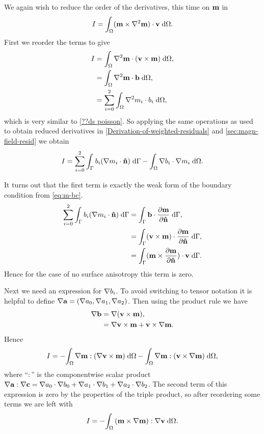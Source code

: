 We again wish to reduce the order of the derivatives, this time on $\mathbf{m}$ in
\begin{equation}
  I = \int_\Omega (\mathbf{m} \times \nabla^2 \mathbf{m}) \cdot \mathbf{v} {\; \text{d}}\Omega.
  \label{eq:46}
\end{equation}
First we reorder the terms to give
\begin{equation}
  \begin{aligned}
    I &= {\int_{\Omega} \nabla^2 \mathbf{m} \cdot (\mathbf{v} \times \mathbf{m}) {\; \text{d}} {\Omega}}, \\
      &= {\int_{\Omega} \nabla^2 \mathbf{m} \cdot {\mathbf{b}} {\; \text{d}} {\Omega}}, \\
      &= \sum_{i=0}^2 {\int_{\Omega} \nabla^2 m_i \cdot b_i {\; \text{d}} {\Omega}},
  \end{aligned}
\end{equation}
which is very similar to \eqref{??ds poisson}. So applying the same operations as used to obtain reduced derivatives in \autoref{Derivation-of-weighted-residuals} and \autoref{sec:magn-field-resid} we obtain
\begin{equation}
  I = \sum_{i=0}^2 {\int_{{\Gamma}} b_i (\nabla m_i \cdot \mathbf{\hat{n}}) {\; \text{d}} {{\Gamma}}} - {\int_{\Omega} \nabla b_i \cdot \nabla m_i {\; \text{d}} {\Omega}}.
\end{equation}

It turns out that the first term is exactly the weak form of the boundary condition from \eqref{eq:m-bc}.
\begin{equation}
  \begin{aligned}
    \sum_{i=0}^2 {\int_{{\Gamma}} b_i (\nabla m_i \cdot \mathbf{\hat{n}}) {\; \text{d}} {{\Gamma}}} 
    &= {\int_{{\Gamma}} {\mathbf{b}} \cdot \frac{\partial \mathbf{m}}{\partial \mathbf{\hat{n}}} {\; \text{d}} {{\Gamma}}}, \\
    &=  {\int_{{\Gamma}} (\mathbf{v} \times \mathbf{m}) \cdot \frac{\partial \mathbf{m}}{\partial \mathbf{\hat{n}}} {\; \text{d}} {{\Gamma}}}, \\
    &=  {\int_{{\Gamma}} (\mathbf{m} \times \frac{\partial \mathbf{m}}{\partial \mathbf{\hat{n}}}) \cdot \mathbf{v} {\; \text{d}} {{\Gamma}}}.
  \end{aligned}
\end{equation}
Hence for the case of no surface anisotropy this term is zero.

Next we need an expression for $\nabla b_i$.
To avoid switching to tensor notation it is helpful to define $\nabla {\mathbf{a}} = (\nabla a_0, \nabla a_1, \nabla a_2)$.
Then using the product rule we have
\begin{equation}
  \begin{aligned}
    \nabla {\mathbf{b}} &= \nabla {\left( \mathbf{v}\times \mathbf{m}\right)}, \\
    & = \nabla \mathbf{v} \times \mathbf{m} + \mathbf{v} \times \nabla \mathbf{m}.
  \end{aligned}
\end{equation}
Hence
\begin{equation}
  I = - {\int_{\Omega} \nabla \mathbf{m} : {\left( \nabla \mathbf{v} \times \mathbf{m} \right)} {\; \text{d}} {\Omega}} 
      - {\int_{\Omega} \nabla \mathbf{m} : {\left( \mathbf{v} \times \nabla \mathbf{m} \right)} {\; \text{d}} {\Omega}},
\end{equation}
where ``$:$'' is the componentwise scalar product $\nabla {\mathbf{a}} : \nabla {\mathbf{c}} = \nabla a_0 \cdot \nabla b_0 + \nabla a_1 \cdot \nabla b_1 + \nabla a_2 \cdot \nabla b_2$.
The second term of this expression is zero by the properties of the triple product, so after reordering some terms we are left with
\begin{equation}
  \label{eq:final-lap-residual}
  I = - {\int_{\Omega} {\left( \mathbf{m} \times \nabla \mathbf{m} \right)} : \nabla \mathbf{v} {\; \text{d}} {\Omega}}.
\end{equation}



